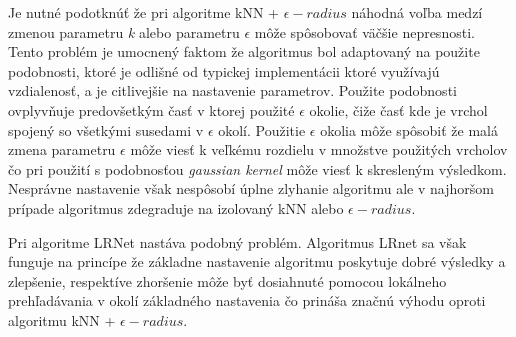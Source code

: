 \documentclass[slovak,master,dept460,male,cpp,cpdeclaration]{diploma}
\begin{document}
Je nutné podotknúť že pri algoritme kNN + $\epsilon-radius$  náhodná voľba medzí zmenou parametru \textit{k} alebo parametru $\epsilon$  môže spôsobovať väčšie nepresnosti. Tento problém je umocnený faktom že algoritmus bol adaptovaný na použite podobnosti, ktoré je odlišné od typickej implementácii ktoré využívajú vzdialenosť, a je citlivejšie na nastavenie parametrov. Použite podobnosti ovplyvňuje predovšetkým časť v ktorej použité  $\epsilon$ okolie, čiže časť kde je vrchol spojený so všetkými susedami v $\epsilon $ okolí. Použitie $\epsilon$ okolia  môže spôsobiť že malá zmena parametru $\epsilon$ môže viesť k veľkému rozdielu v množstve použitých vrcholov čo pri použití s podobnosťou \textit{gaussian kernel} môže viesť k skresleným výsledkom. Nesprávne nastavenie však nespôsobí úplne zlyhanie algoritmu ale v najhoršom prípade algoritmus zdegraduje na izolovaný kNN alebo $\epsilon - radius$.

Pri algoritme LRNet nastáva podobný problém. Algoritmus LRnet sa však funguje na princípe že základne nastavenie algoritmu poskytuje dobré výsledky a zlepšenie, respektíve zhoršenie môže byť dosiahnuté pomocou lokálneho prehľadávania v okolí základného nastavenia čo prináša značnú výhodu oproti algoritmu kNN + $\epsilon-radius$.
\end{document}
